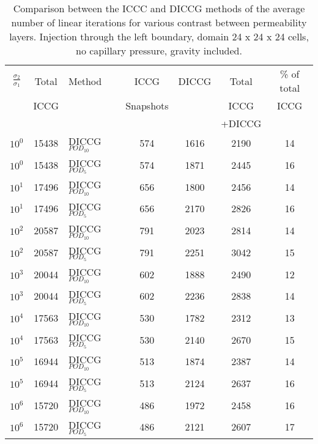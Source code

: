 \documentclass[12pt]{article}
\begin{document}
\begin{table}[!h]\centering
\begin{minipage}{1\textwidth}
 \centering
\begin{tabular}{ ||c|c||l|c|c|c|c||} 
\hline
$\frac{\sigma_2}{\sigma_1}$&Total&Method  & ICCG&DICCG &Total&\% of total\\ 
                           & ICCG     &  & Snapshots& &ICCG& ICCG\\ 
                           &     &  & & &+DICCG& \\
\hline  
$10^{0}$ &15438& DICCG$_{POD_{10}}$&574&1616&2190&14 \\ 
\hline  
$10^{0}$ &15438& DICCG$_{POD_{5}}$&574&1871&2445&16 \\ 
\hline  
$10^{1}$ &17496& DICCG$_{POD_{10}}$&656&1800&2456&14 \\ 
\hline  
$10^{1}$ &17496& DICCG$_{POD_{5}}$&656&2170&2826&16 \\ 
\hline  
$10^{2}$ &20587& DICCG$_{POD_{10}}$&791&2023&2814&14 \\ 
\hline  
$10^{2}$ &20587& DICCG$_{POD_{5}}$&791&2251&3042&15 \\ 
\hline  
$10^{3}$ &20044& DICCG$_{POD_{10}}$&602&1888&2490&12 \\ 
\hline  
$10^{3}$ &20044& DICCG$_{POD_{5}}$&602&2236&2838&14 \\ 
\hline  
$10^{4}$ &17563& DICCG$_{POD_{10}}$&530&1782&2312&13 \\ 
\hline  
$10^{4}$ &17563& DICCG$_{POD_{5}}$&530&2140&2670&15 \\ 
\hline
$10^{5}$ &16944& DICCG$_{POD_{10}}$&513&1874&2387&14 \\ 
\hline  
$10^{5}$ &16944& DICCG$_{POD_{5}}$&513&2124&2637&16 \\ 
\hline 
$10^{6}$ &15720& DICCG$_{POD_{10}}$&486&1972&2458&16 \\ 
\hline  
$10^{6}$ &15720& DICCG$_{POD_{5}}$&486&2121&2607&17 \\ 
\hline 
\end{tabular} 
\caption{Comparison between the ICCC and DICCG methods of the average number of linear iterations for various contrast between permeability layers. Injection through the left boundary, domain 24 x 24 x 24 cells, no capillary pressure, gravity  included.}\label{table:liter1b} 
\end{minipage}  
\end{table}  
\end{document}
